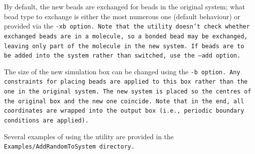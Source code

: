 By default, the new beads are exchanged for beads in the original system; what
bead type to exchange is either the most numerous one (default behaviour) or
provided via the \tt{-xb} option. Note that the utility doesn't check whether
exchanged beads are in a molecule, so a bonded bead may be exchanged, leaving
only part of the molecule in the new system. If beads are to be added into the
system rather than switched, use the \tt{--add} option.

The size of the new simulation box can be changed using the \tt{-b} option.
Any constraints for placing beads are applied to this box rather than the one in
the original system. The new system is placed so the centres of the original box
and the new one coincide. Note that in the end, all coordinates are wrapped into
the output box (i.e., periodic boundary conditions are applied).

Several examples of using the utility are provided in the
\tt{Examples/AddRandomToSystem} directory.

